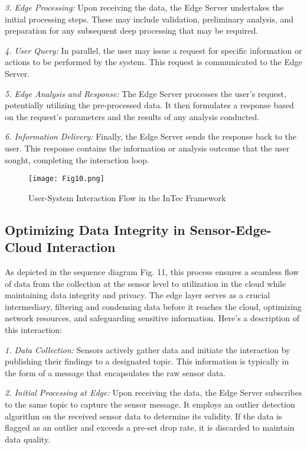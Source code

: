 \documentclass[11pt]{article}
\begin{document}
	\textit{3. Edge Processing:} Upon receiving the data, the Edge Server undertakes the initial processing steps. These may include validation, preliminary analysis, and preparation for any subsequent deep processing that may be required.
	
	\textit{4. User Query:} In parallel, the user may issue a request for specific information or actions to be performed by the system. This request is communicated to the Edge Server.
	
	\textit{5. Edge Analysis and Response:} The Edge Server processes the user's request, potentially utilizing the pre-processed data. It then formulates a response based on the request's parameters and the results of any analysis conducted.
	
	\textit{6. Information Delivery:} Finally, the Edge Server sends the response back to the user. This response contains the information or analysis outcome that the user sought, completing the interaction loop.
	
	\begin{figure}[b]
		\centering
		\texttt{[image: Fig10.png]}
		\caption{User-System Interaction Flow in the InTec Framework}
	\end{figure}
	
	\subsection{Optimizing Data Integrity in Sensor-Edge-Cloud Interaction}
	As depicted in the sequence diagram Fig. 11, this process ensures a seamless flow of
	data from the collection at the sensor level to utilization in the cloud while maintaining data integrity and privacy. The edge layer serves as a crucial intermediary, filtering and condensing data before it reaches the cloud, optimizing network resources,
	and safeguarding sensitive information. Here’s a description of this interaction:
	
	\textit{1. Data Collection:} Sensors actively gather data and initiate the interaction by publishing their findings to a designated topic. This information is typically in the form of a message that encapsulates the raw sensor data.
	
	\textit{2. Initial Processing at Edge:} Upon receiving the data, the Edge Server subscribes to the same topic to capture the sensor message. It employs an outlier detection algorithm on the received sensor data to determine its validity. If the data is flagged as an outlier and exceeds a pre-set drop rate, it is discarded to maintain data quality.
	
\end{document}
